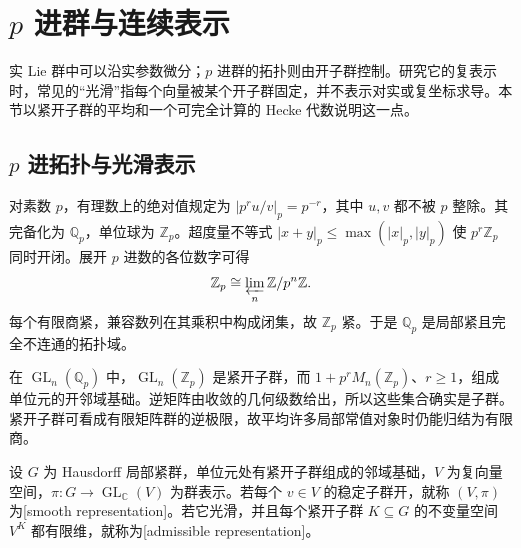 
\section{\texorpdfstring{\(p\) 进群与连续表示}{p 进群与连续表示}}
\label{b5:sec:C03}

%
%

实 Lie 群中可以沿实参数微分；\(p\) 进群的拓扑则由开子群控制。研究它的复表示时，常见的“光滑”指每个向量被某个开子群固定，并不表示对实或复坐标求导。本节以紧开子群的平均和一个可完全计算的 Hecke 代数说明这一点。

\subsection{\texorpdfstring{\(p\) 进拓扑与光滑表示}{p 进拓扑与光滑表示}}
\label{b5:subsec:C03:01}

对素数 \(p\)，有理数上的绝对值规定为 \(|p^ru/v|_p=p^{-r}\)，其中 \(u,v\) 都不被 \(p\) 整除。其完备化为 \(\mathbb Q_p\)，单位球为 \(\mathbb Z_p\)。超度量不等式 \(|x+y|_p\le\max(|x|_p,|y|_p)\) 使 \(p^r\mathbb Z_p\) 同时开闭。展开 \(p\) 进数的各位数字可得
\[
	\mathbb Z_p\cong\varprojlim_n\mathbb Z/p^n\mathbb Z.
\]
每个有限商紧，兼容数列在其乘积中构成闭集，故 \(\mathbb Z_p\) 紧。于是 \(\mathbb Q_p\) 是局部紧且完全不连通的拓扑域。

\ProseParagraphBreak
在 \(\operatorname{GL}_n(\mathbb Q_p)\) 中，\(\operatorname{GL}_n(\mathbb Z_p)\) 是紧开子群，而 \(1+p^rM_n(\mathbb Z_p)\)、\(r\ge1\)，组成单位元的开邻域基础。逆矩阵由收敛的几何级数给出，所以这些集合确实是子群。紧开子群可看成有限矩阵群的逆极限，故平均许多局部常值对象时仍能归结为有限商。

\begin{definition}\label{b5:def:smooth-admissible-padic}
	设 \(G\) 为 Hausdorff 局部紧群，单位元处有紧开子群组成的邻域基础，\(V\) 为复向量空间，\(\pi:G\to\operatorname{GL}_{\mathbb C}(V)\) 为群表示。若每个 \(v\in V\) 的稳定子群开，就称 \((V,\pi)\) 为[smooth representation]。若它光滑，并且每个紧开子群 \(K\subseteq G\) 的不变量空间 \(V^K\) 都有限维，就称为[admissible representation]。
\end{definition}

